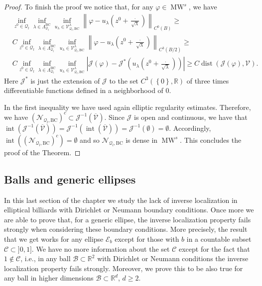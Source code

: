 \documentclass{amsart}
\theoremstyle{definition}
\theoremstyle{remark}
\newcommand{\inte}{\operatorname{int}}
\DeclareMathOperator\dist{dist} \DeclareMathOperator\diam{diam}
\renewcommand\geq\geqslant
\numberwithin{equation}{section}
\theoremstyle{definition}
\theoremstyle{remark}
\DeclareMathOperator\MW{MW}
\begin{document}
\begin{proof}
	To finish the proof we notice that, for any $\varphi\in\MW^s$,  we have \begin{equation}
	\begin{aligned}
		&\inf_{z^0\in \mathcal{Q}_l}\inf_{\lambda\in\Lambda_{\mathcal{Q}_l}^{\mathrm{BC}}}\inf_{u_\lambda \in\mathcal{V}_{\mathcal{Q}_l,\mathrm{BC}}^\lambda}\left\|\varphi-u_\lambda\left(z^0+\frac{\cdot}{\sqrt{\lambda}}\right)\right\|_{C^0\left(B\right)}\geq\\&C \inf_{z^0\in \mathcal{Q}_l}\inf_{\lambda\in\Lambda_{\mathcal{Q}_l}^{\mathrm{BC}}}\inf_{u_\lambda \in\mathcal{V}_{\mathcal{Q}_l,\mathrm{BC}}^\lambda}\left\|\varphi-u_\lambda\left(z^0+\frac{\cdot}{\sqrt{\lambda}}\right)\right\|_{C^3\left(B/2\right)}\geq\\&C \inf_{z^0\in \mathcal{Q}_l}\inf_{\lambda\in\Lambda_{\mathcal{Q}_l}^{\mathrm{BC}}}\inf_{u_\lambda \in\mathcal{V}_{\mathcal{Q}_l,\mathrm{BC}}^\lambda}\left|\mathcal{J}\left(\varphi\right)-\mathcal{J}^*\left(u_\lambda\left(z^0+\frac{\cdot}{\sqrt{\lambda}}\right)\right)\right|\geq C \dist\left(\mathcal{J}\left(\varphi\right),\mathcal{V}\right).
	\end{aligned}
	\end{equation}Here $\mathcal{J}^*$ is just the extension of $\mathcal{J}$ to the set $C^3\left(\left\{0\right\},\mathbb{R}\right)$ of three times differentiable functions defined in a neighborhood of $0$. 
    
    In the first inequality we have used again elliptic regularity estimates. Therefore, we have $\left(\mathcal{N}_{\mathcal{Q}_l,\mathrm{BC}}\right)^c\subset\mathcal{J}^{-1}\left(\overline{\mathcal{V}}\right)$. Since $\mathcal{J}$ is open and continuous, we have that $\inte\left(\mathcal{J}^{-1}\left(\overline{\mathcal{V}}\right)\right)=\mathcal{J}^{-1}\left(\inte\left(\overline{\mathcal{V}}\right)\right)=\mathcal{J}^{-1}\left(\emptyset\right)=\emptyset$. Accordingly, $\inte\left(\left(\mathcal{N}_{\mathcal{Q}_l,\mathrm{BC}}\right)^c\right)=\emptyset$ and so $\mathcal{N}_{\mathcal{Q}_l,\mathrm{BC}}$ is dense in $\MW^s$. This concludes the proof of the Theorem.
\end{proof} 
\subsection{Balls and generic ellipses}\label{Noelli}
In this last section of the chapter we study the lack of inverse localization in elliptical billiards with Dirichlet or Neumann boundary conditions. Once more we are able to prove that, for a generic ellipse, the inverse localization property fails strongly when considering these boundary conditions. More precisely, the result that we get works for any ellipse $\mathcal{E}_b$ except for those with $b$ in a countable subset $\mathcal{C}\subset]0,1]$. We have no more information about the set $\mathcal{C}$ except for the fact that $1\notin\mathcal{C}$, i.e., in any ball $\mathcal{B}\subset\mathbb{R}^2$ with Dirichlet or Neumann conditions the inverse localization property fails strongly. Moreover, we prove this to be also true for any ball in higher dimensions $\mathcal{B}\subset\mathbb{R}^{d}$, $d\geq 2$.
\end{document}
